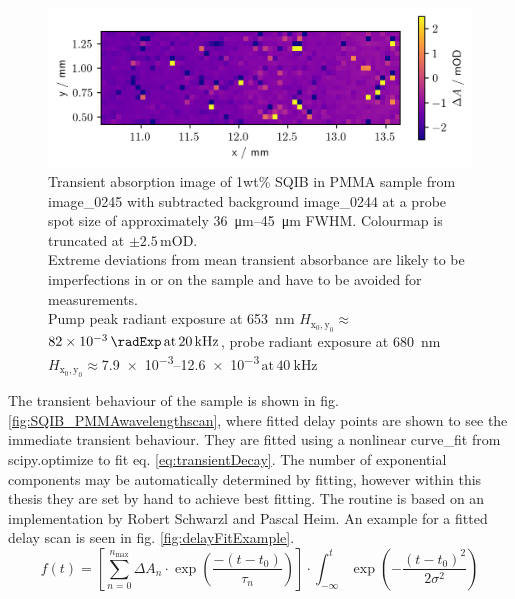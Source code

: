 \documentclass[twoside,openright,listof=numbered]{scrreprt}
\def\pumpExp#1{\ensuremath{\SI{#1}{\radExp}\,\mathrm{at}\, \SI{20}{\kilo\hertz}}}
\def\frep#1{\ensuremath{\,\mathrm{at}\, \SI{#1}{\kilo\hertz}}}
\def\radiantExp{\ensuremath{H_\mathrm{x_0,y_0}}}
\begin{document}
\begin{figure}[hbt]
\centering
\includegraphics[scale=1]{images/1percentSQIBinPMMA_Sample653-680Image.png}
\caption[Transient absorption image of 1wt\% SQIB in PMMA sample from image\_0245 with subtracted background image\_0244 for pump \qty{653}{\nano\meter} and probe \qty{680}{\nano\meter}.]{Transient absorption image of 1wt\% SQIB in PMMA sample from image\_0245 with subtracted background image\_0244 at a probe spot size of approximately \SIrange{36}{45}{\micro\meter} FWHM. Colourmap is truncated at $\pm2.5\,\text{mOD}$.\\ Extreme deviations from mean transient absorbance are likely to be imperfections in or on the sample and have to be avoided for measurements.\\ Pump peak radiant exposure at \SI{653}{\nano\meter} $\radiantExp\approx$ \pumpExp{82e-3}, probe radiant exposure at \SI{680}{\nano\meter} $\radiantExp\approx$\SIrange{7.9e-3}{12.6e-3}{\radExp}\frep{40} \label{fig:TA_image_sample}}
\end{figure}

The transient behaviour of the sample is shown in fig. \ref{fig:SQIB_PMMAwavelengthscan}, where fitted delay points are shown to see the immediate transient behaviour. They are fitted using a nonlinear curve\_fit from scipy.optimize to fit eq. \ref{eq:transientDecay}. The number of exponential components may be automatically determined by fitting, however within this thesis they are set by hand to achieve best fitting. The routine is based on an implementation by Robert Schwarzl and Pascal Heim. An example for a fitted delay scan is seen in fig. \ref{fig:delayFitExample}.
\begin{equation}\label{eq:transientDecay}
f(t) = \left[\sum_{n=0}^{n_\text{max}} \Delta A_n\cdot \exp{\left(\frac{-(t-t_0)}{\tau_n}\right)}\right]\cdot \int_{-\infty}^t \exp \left(-\frac{(t-t_0)^2}{2\sigma^2}\right)
\end{equation}
\end{document}
